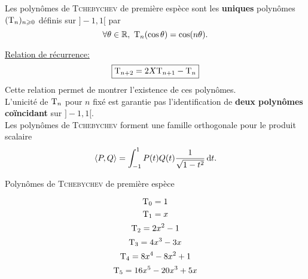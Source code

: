 \begin{defi}
    Les polynômes de \textsc{Tchebychev} de première espèce sont les \textbf{uniques} polynômes $(\mathrm{T}_n)_{n \geqslant 0}$ définis sur $]-1, 1[$ par
    $$\forall \theta \in \mathbb{R},\ \mathrm{T}_n (\cos \theta) = \cos(n \theta).$$
\end{defi}

\underline{Relation de récurrence:}
$$\boxed{\mathrm{T}_{n+2} = 2X \mathrm{T}_{n+1} - \mathrm{T}_n}$$
Cette relation permet de montrer l'existence de ces polynômes. \\
L'unicité de $\mathrm{T}_n$ pour $n$ fixé est garantie pas l'identification de \textbf{deux polynômes coïncidant} sur $]-1, 1[$. \\
Les polynômes de \textsc{Tchebychev} forment une famille orthogonale pour le produit scalaire
$$\langle P, Q \rangle = \int_{-1}^{1} P(t) Q(t) \frac{1}{\sqrt{1-t^2}} \, \mathrm{d} t.$$

\begin{marginfigure}[-8.5cm]
    \centering
	
	\caption*{\centering Polynômes de \textsc{Tchebychev} de première espèce}
	{\small
	\color{blue} $$\mathrm{T}_0 = 1$$
	\color{red} $$\mathrm{T}_1 = x$$
	\color{green} $$\mathrm{T}_2 = 2x^2-1$$
	\color{purple} $$\mathrm{T}_3 = 4x^3-3x$$
	\color{black} $$\mathrm{T}_4 = 8x^4-8x^2+1$$
	\color{orange} $$\mathrm{T}_5 = 16x^5-20x^3+5x$$
	}
\end{marginfigure}
